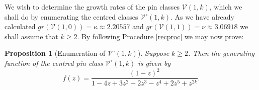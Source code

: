 \documentclass[11pt,a4paper]{article}
\newtheorem{prop}[thm]{Proposition}
\theoremstyle{definition}
\begin{document}
We wish to determine the growth rates of the pin classes $\mathcal{V}(1,k)$, which we shall do by enumerating the centred classes $\mathcal{V}^{\circ}(1,k)$. As we have already calculated $gr(\mathcal{V}(1,0)) = \kappa \approx 2.20557$ and $gr(\mathcal{V}(1,1)) = \nu \approx 3.06918$ we shall assume that $k \geq 2$. By following Procedure \ref{recproc} we may now prove:

\begin{prop}[Enumeration of $\mathcal{V}^{\circ}(1,k)$] \label{ajfsd;kl}
Suppose $k \geq 2$. Then the generating function of the centred pin class $\mathcal{V}^{\circ}(1,k)$ is given by
\begin{equation} \label{kiosdfu8979i}
f(z) = \frac{(1-z)^2}{1 - 4z + 3z^2 - 2z^3 - z^4 + 2z^5 + z^{2k}}.
\end{equation}
\end{prop}
\end{document}
